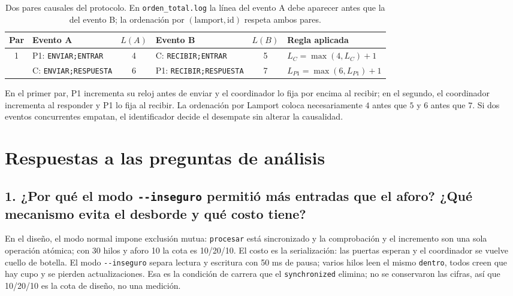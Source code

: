 \documentclass[10pt]{article}
\newcommand{\cod}[1]{\texttt{#1}}
\begin{document}
\begin{table}[H]
\centering
\small
\renewcommand{\arraystretch}{1.2}
\begin{tabularx}{\textwidth}{@{}c >{\raggedright\arraybackslash}p{3.7cm} c >{\raggedright\arraybackslash}p{3.7cm} c X@{}}
\toprule
\textbf{Par} & \textbf{Evento A} & \textbf{$L(A)$} & \textbf{Evento B} & \textbf{$L(B)$} & \textbf{Regla aplicada} \\
\midrule
1 & P1: \cod{ENVIAR;ENTRAR} & 4 & C: \cod{RECIBIR;ENTRAR} & 5 &
$L_C = \max(4, L_C)+1$ \\
\addlinespace
2 & C: \cod{ENVIAR;RESPUESTA} & 6 & P1: \cod{RECIBIR;RESPUESTA} & 7 &
$L_{P1} = \max(6, L_{P1})+1$ \\
\bottomrule
\end{tabularx}
\caption{Dos pares causales del protocolo. En \cod{orden\_total.log} la línea
del evento A debe aparecer antes que la del evento B; la ordenación por
$(\text{lamport},\text{id})$ respeta ambos pares.}
\label{tab:causales}
\end{table}

En el primer par, P1 incrementa su reloj antes de enviar y el coordinador lo
fija por encima al recibir; en el segundo, el coordinador incrementa al
responder y P1 lo fija al recibir. La ordenación por Lamport coloca
necesariamente $4$ antes que $5$ y $6$ antes que $7$. Si dos eventos
concurrentes empatan, el identificador decide el desempate sin alterar la
causalidad.

\section{Respuestas a las preguntas de análisis}

\subsection*{1. ¿Por qué el modo \cod{-{}-inseguro} permitió más entradas que el aforo? ¿Qué mecanismo evita el desborde y qué costo tiene?}

En el diseño, el modo normal impone exclusión mutua: \cod{procesar} está
sincronizado y la comprobación y el incremento son una sola operación atómica;
con 30 hilos y
aforo 10 la cota es 10/20/10. El costo es la serialización: las puertas esperan
y el coordinador se vuelve cuello de botella. El modo \cod{-{}-inseguro} separa
lectura y escritura con 50 ms de pausa; varios hilos leen el mismo
\cod{dentro}, todos creen que hay cupo y se pierden actualizaciones. Esa es la
condición de carrera que el \cod{synchronized} elimina; no se conservaron las
cifras, así que 10/20/10 es la cota de diseño, no una medición.
\end{document}
